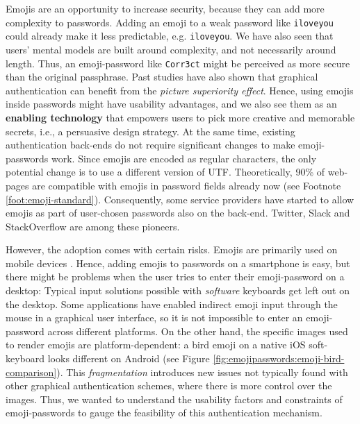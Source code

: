 Emojis are an opportunity to increase security, because they can add more complexity to passwords. Adding an emoji to a weak password like \texttt{iloveyou} could already make it less predictable, e.g. \texttt{iloveyou}. We have also seen that users' mental models are built around complexity, and not necessarily around length. Thus, an emoji-password like \texttt{Corr3ct} might be perceived as more secure than the original passphrase. Past studies have also shown that graphical authentication can benefit from the \textit{picture superiority effect}. Hence, using emojis inside passwords might have usability advantages, and we also see them as an \textbf{enabling technology} that empowers users to pick more creative and memorable secrets, i.e., a persuasive design strategy. At the same time, existing authentication back-ends do not require significant changes to make emoji-passwords work. Since emojis are encoded as regular characters, the only potential change is to use a different version of UTF. Theoretically, 90\% of web-pages are compatible with emojis in password fields already now (see Footnote \ref{foot:emoji-standard}). Consequently, some service providers have started to allow emojis as part of user-chosen passwords also on the back-end. Twitter, Slack and StackOverflow are among these pioneers. 

However, the adoption comes with certain risks. Emojis are primarily used on mobile devices \cite{EmogiResearch2016}. Hence, adding emojis to passwords on a smartphone is easy, but there might be problems when the user tries to enter their emoji-password on a desktop: Typical input solutions possible with \textit{software} keyboards get left out on the desktop. Some applications have enabled indirect emoji input through the mouse in a graphical user interface, so it is not impossible to enter an emoji-password across different platforms. On the other hand, the specific images used to render emojis are platform-dependent: a bird emoji on a native iOS soft-keyboard looks different on Android (see Figure \ref{fig:emojipasswords:emoji-bird-comparison}). This \textit{fragmentation} introduces new issues not typically found with other graphical authentication schemes, where there is more control over the images. 
Thus, we wanted to understand the usability factors and constraints of emoji-passwords to gauge the feasibility of this authentication mechanism.

